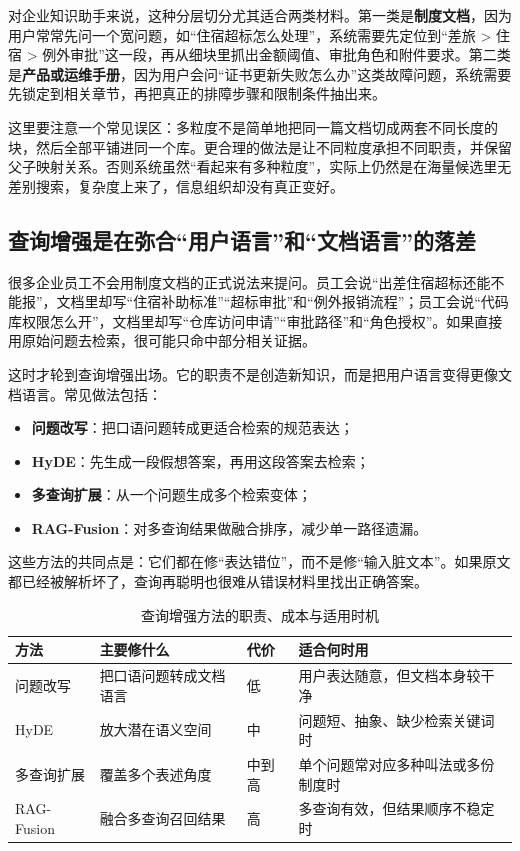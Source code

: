 对企业知识助手来说，这种分层切分尤其适合两类材料。第一类是\textbf{制度文档}，因为用户常常先问一个宽问题，如“住宿超标怎么处理”，系统需要先定位到“差旅 > 住宿 > 例外审批”这一段，再从细块里抓出金额阈值、审批角色和附件要求。第二类是\textbf{产品或运维手册}，因为用户会问“证书更新失败怎么办”这类故障问题，系统需要先锁定到相关章节，再把真正的排障步骤和限制条件抽出来。

这里要注意一个常见误区：多粒度不是简单地把同一篇文档切成两套不同长度的块，然后全部平铺进同一个库。更合理的做法是让不同粒度承担不同职责，并保留父子映射关系。否则系统虽然“看起来有多种粒度”，实际上仍然是在海量候选里无差别搜索，复杂度上来了，信息组织却没有真正变好。

\subsection{查询增强是在弥合“用户语言”和“文档语言”的落差}
很多企业员工不会用制度文档的正式说法来提问。员工会说“出差住宿超标还能不能报”，文档里却写“住宿补助标准”“超标审批”和“例外报销流程”；员工会说“代码库权限怎么开”，文档里却写“仓库访问申请”“审批路径”和“角色授权”。如果直接用原始问题去检索，很可能只命中部分相关证据。

这时才轮到查询增强出场。它的职责不是创造新知识，而是把用户语言变得更像文档语言。常见做法包括：
\begin{itemize}
  \item \textbf{问题改写}：把口语问题转成更适合检索的规范表达；
  \item \textbf{HyDE}：先生成一段假想答案，再用这段答案去检索；
  \item \textbf{多查询扩展}：从一个问题生成多个检索变体；
  \item \textbf{RAG-Fusion}：对多查询结果做融合排序，减少单一路径遗漏。
\end{itemize}

这些方法的共同点是：它们都在修“表达错位”，而不是修“输入脏文本”。如果原文都已经被解析坏了，查询再聪明也很难从错误材料里找出正确答案。

\begin{table}[H]
\centering
\small
\begin{tabularx}{\textwidth}{>{\raggedright\arraybackslash}p{2.5cm}>{\raggedright\arraybackslash}p{2.8cm}>{\raggedright\arraybackslash}p{2.5cm}>{\raggedright\arraybackslash}X}
\toprule
\textbf{方法} & \textbf{主要修什么} & \textbf{代价} & \textbf{适合何时用} \\
\midrule
问题改写 & 把口语问题转成文档语言 & 低 & 用户表达随意，但文档本身较干净 \\
HyDE & 放大潜在语义空间 & 中 & 问题短、抽象、缺少检索关键词时 \\
多查询扩展 & 覆盖多个表述角度 & 中到高 & 单个问题常对应多种叫法或多份制度时 \\
RAG-Fusion & 融合多查询召回结果 & 高 & 多查询有效，但结果顺序不稳定时 \\
\bottomrule
\end{tabularx}
\caption{查询增强方法的职责、成本与适用时机}
\label{tab:rag-query-enhancement}
\end{table}

